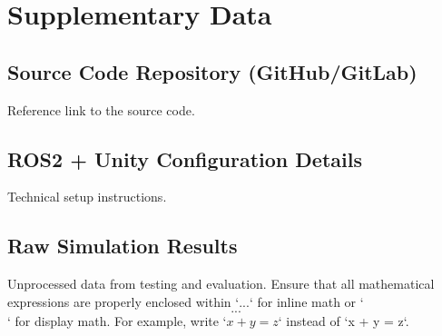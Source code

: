 \documentclass[a4paper,11pt]{report}
\begin{document}
\section{Supplementary Data}
\subsection{Source Code Repository (GitHub/GitLab)}
Reference link to the source code.

\subsection{ROS2 + Unity Configuration Details}
Technical setup instructions.

\subsection{Raw Simulation Results}
Unprocessed data from testing and evaluation. Ensure that all mathematical expressions are properly enclosed within `$...$` for inline math or `\[...\]` for display math. For example, write `$x + y = z$` instead of `x + y = z`.
\end{document}

